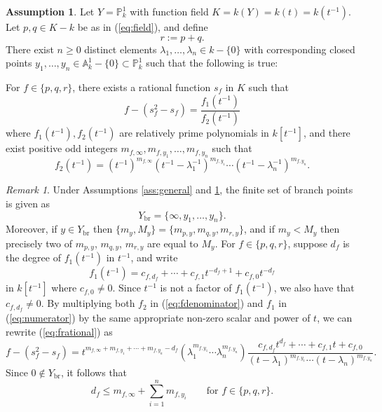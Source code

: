 \documentclass{amsart}
\numberwithin{equation}{section}
\numberwithin{table}{section}
\theoremstyle{plain}
\theoremstyle{definition}
\newtheorem{assume}[theorem]{Assumption}
\theoremstyle{remark}
\newtheorem{remark}[theorem]{Remark}
\begin{document}
\begin{assume}
\label{ass:overP1}
Let $Y=\mathbb{P}^1_k$ with function field $K=k(Y)=k(t)=k(t^{-1})$. Let $p,q\in K-k$ be as in (\ref{eq:field}), and define
\begin{equation}
\label{eq:r!}
r:=p+q.
\end{equation} 
There exist $n\ge 0$ distinct elements $\lambda_1,\ldots,\lambda_n\in k-\{0\}$ with corresponding closed points $y_1,\ldots, y_n\in\mathbb{A}^1_k-\{0\}\subset\mathbb{P}^1_k$ such that the following is true: 

For $f\in\{p,q,r\}$, there exists a rational  function $s_f$ in $K$ such that
\begin{equation}
\label{eq:frational}
f - (s_f^2-s_f) = \frac{f_1(t^{-1})}{f_2(t^{-1})}
\end{equation}
where $f_1(t^{-1}),f_2(t^{-1})$ are relatively prime polynomials  in $k[t^{-1}]$, and there exist positive odd integers $m_{f,\infty},m_{f,y_1},\ldots,m_{f,y_n}$ such that
\begin{equation}
\label{eq:fdenominator}
f_2(t^{-1}) = (t^{-1})^{m_{f,\infty}}(t^{-1}-\lambda_1^{-1})^{m_{f,y_1}} \cdots (t^{-1}-\lambda_n^{-1})^{m_{f,y_n}}.
\end{equation}
\end{assume}

\begin{remark}
\label{rem:overP1}
Under Assumptions \ref{ass:general} and \ref{ass:overP1}, the finite set of branch points is given as 
$$Y_{\mathrm{br}}=\{\infty,y_1,\ldots,y_n\} .$$
Moreover, if $y\in Y_{\mathrm{br}}$ then $\{m_y,M_y\} = \{m_{p,y},m_{q,y},m_{r,y}\}$, and if $m_y < M_y$ then precisely two of $m_{p,y}$, $m_{q,y}$, $m_{r,y}$ are equal to $M_y$. 
For $f\in\{p,q,r\}$, suppose $d_f$ is the degree of $f_1(t^{-1})$ in $t^{-1}$, and write
\begin{equation}
\label{eq:numerator}
f_1(t^{-1}) = c_{f,d_f}+ \cdots + c_{f,1} t^{-d_f+1}  + c_{f,0} t^{-d_f} 
\end{equation}
in $k[t^{-1}]$ where $c_{f,0}\ne 0$. Since $t^{-1}$ is not a factor of $f_1(t^{-1})$, we also have that $c_{f,d_f}\ne 0$. By multiplying both $f_2$ in (\ref{eq:fdenominator}) and $f_1$ in (\ref{eq:numerator}) by the same appropriate non-zero scalar and  power of $t$, we can rewrite (\ref{eq:frational}) as
$$f - (s_f^2-s_f)= t^{m_{f,\infty}+m_{f,y_1}+\cdots + m_{f,y_n}-d_f} \left(\lambda_1^{m_{f,y_1}} \cdots \lambda_n^{m_{f,y_n}} \right) \frac{c_{f,d_f}t^{d_f} + \cdots + c_{f,1} t + c_{f,0}}{ (t-\lambda_1)^{m_{f,y_1}} \cdots (t-\lambda_n)^{m_{f,y_n}}} .$$
Since $0\not\in Y_{\mathrm{br}}$, it follows that 
\begin{equation}
\label{eq:rationaldegree}
d_f \le m_{f,\infty}+\sum_{i=1}^n m_{f,y_i}\qquad \mbox{for $f\in\{p,q,r\}$.}
\end{equation}
\end{remark}
\end{document}
